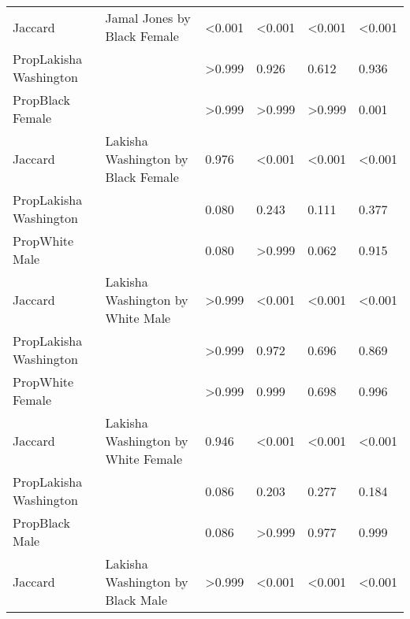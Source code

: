\begin{tabular}{llllll}
Jaccard & \multirow{-3}{*}{\raggedright\arraybackslash Jamal Jones by Black Female} & <0.001 & <0.001 & <0.001 & <0.001\\
\cmidrule{1-6}
PropLakisha Washington &  & >0.999 & 0.926 & 0.612 & 0.936\\

PropBlack Female &  & >0.999 & >0.999 & >0.999 & 0.001\\

Jaccard & \multirow{-3}{*}{\raggedright\arraybackslash Lakisha Washington by Black Female} & 0.976 & <0.001 & <0.001 & <0.001\\
\cmidrule{1-6}
PropLakisha Washington &  & 0.080 & 0.243 & 0.111 & 0.377\\

PropWhite Male &  & 0.080 & >0.999 & 0.062 & 0.915\\

Jaccard & \multirow{-3}{*}{\raggedright\arraybackslash Lakisha Washington by White Male} & >0.999 & <0.001 & <0.001 & <0.001\\
\cmidrule{1-6}
PropLakisha Washington &  & >0.999 & 0.972 & 0.696 & 0.869\\

PropWhite Female &  & >0.999 & 0.999 & 0.698 & 0.996\\

Jaccard & \multirow{-3}{*}{\raggedright\arraybackslash Lakisha Washington by White Female} & 0.946 & <0.001 & <0.001 & <0.001\\
\cmidrule{1-6}
PropLakisha Washington &  & 0.086 & 0.203 & 0.277 & 0.184\\

PropBlack Male &  & 0.086 & >0.999 & 0.977 & 0.999\\

Jaccard & \multirow{-3}{*}{\raggedright\arraybackslash Lakisha Washington by Black Male} & >0.999 & <0.001 & <0.001 & <0.001\\
\bottomrule
\end{tabular}

